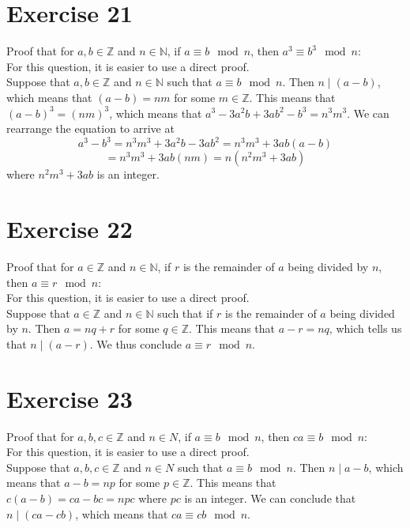 \documentclass[12pt]{article}
\newcommand{\N}{\mathbb{N}}
\newcommand{\Z}{\mathbb{Z}}
\begin{document}
    \section*{Exercise 21}
    Proof that for $a, b \in \Z$ and $n \in \N$,
    if $a \equiv b \mod n$,
    then $a^3 \equiv b^3 \mod n$: \\
    For this question, it is easier to use a direct proof. \\
    Suppose that $a, b \in \Z$ and $n \in \N$
    such that $a \equiv b \mod n$.
    Then $n \mid (a - b)$,
    which means that $(a-b) = nm$ for some $m \in \Z$.
    This means that $(a-b)^3 = (nm)^3$,
    which means that $a^3 - 3a^2b + 3ab^2 - b^3 = n^3m^3$.
    We can rearrange the equation to arrive at
    \[ a^3 - b^3 = n^3m^3 + 3a^2b - 3ab^2 = n^3m^3 + 3ab(a-b) \]
    \[ = n^3m^3 + 3ab(nm) = n(n^2m^3 + 3ab) \]
    where $n^2m^3 + 3ab$ is an integer.

    \section*{Exercise 22}
    Proof that for $a \in \Z$ and $n \in \N$,
    if $r$ is the remainder of $a$ being divided by $n$,
    then $a \equiv r \mod n$: \\
    For this question, it is easier to use a direct proof. \\
    Suppose that $a \in \Z$ and $n \in \N$ such that
    if $r$ is the remainder of $a$ being divided by $n$.
    Then $a = nq + r$ for some $q \in \Z$. 
    This means that $a - r = nq$,
    which tells us that $n \mid (a-r)$.
    We thus conclude $a \equiv r \mod n$. \\

    \section*{Exercise 23}
    Proof that for $a, b, c \in \Z$ and $n \in N$,
    if $a \equiv b \mod n$,
    then $ca \equiv b \mod n$: \\
    For this question, it is easier to use a direct proof. \\
    Suppose that $a, b, c \in \Z$ and $n \in N$
    such that $a \equiv b \mod n$.
    Then $n \mid a - b$,
    which means that $a-b = np$ for some $p \in \Z$.
    This means that $c(a-b) = ca - bc = npc$
    where $pc$ is an integer.
    We can conclude that $n \mid (ca - cb)$,
    which means that $ca \equiv cb \mod n$. \\
\end{document}
